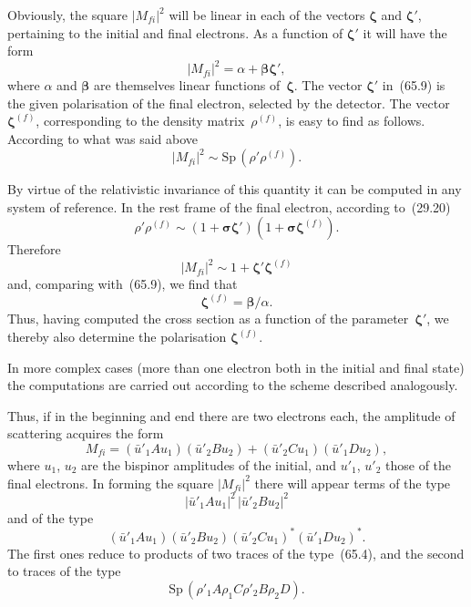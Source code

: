 Obviously, the square $|M_{fi}|^2$ will be linear in each of the vectors $\boldsymbol{\zeta}$ and $\boldsymbol{\zeta}'$, pertaining to the initial and final electrons. As a function of $\boldsymbol{\zeta}'$ it will have the form
\begin{equation}
|M_{fi}|^2 = \alpha + \boldsymbol{\beta}\boldsymbol{\zeta}',
\tag{65.9}
\end{equation}
where $\alpha$ and $\boldsymbol{\beta}$ are themselves linear functions of~$\boldsymbol{\zeta}$. The vector $\boldsymbol{\zeta}'$ in~(65.9) is the given polarisation of the final electron, selected by the detector. The vector $\boldsymbol{\zeta}^{(f)}$, corresponding to the density matrix~$\rho^{(f)}$, is easy to find as follows. According to what was said above
\[
|M_{fi}|^2 \sim \mathrm{Sp}\,(\rho'\rho^{(f)}).
\]

By virtue of the relativistic invariance of this quantity it can be computed in any system of reference. In the rest frame of the final electron, according to~(29.20)
\[
\rho'\rho^{(f)} \sim (1 + \boldsymbol{\sigma}\boldsymbol{\zeta}')(1 + \boldsymbol{\sigma}\boldsymbol{\zeta}^{(f)}).
\]
Therefore
\[
|M_{fi}|^2 \sim 1 + \boldsymbol{\zeta}'\boldsymbol{\zeta}^{(f)}
\]
and, comparing with~(65.9), we find that
\begin{equation}
\boldsymbol{\zeta}^{(f)} = \boldsymbol{\beta}/\alpha.
\tag{65.10}
\end{equation}
Thus, having computed the cross section as a function of the parameter~$\boldsymbol{\zeta}'$, we thereby also determine the polarisation $\boldsymbol{\zeta}^{(f)}$.

In more complex cases (more than one electron both in the initial and final state) the computations are carried out according to the scheme described analogously.

Thus, if in the beginning and end there are two electrons each, the amplitude of scattering acquires the form
\[
M_{fi} = (\bar{u}'_1 Au_1)(\bar{u}'_2 Bu_2) + (\bar{u}'_2 Cu_1)(\bar{u}'_1 Du_2),
\]
where $u_1$, $u_2$ are the bispinor amplitudes of the initial, and $u'_1$, $u'_2$ those of the final electrons. In forming the square $|M_{fi}|^2$ there will appear terms of the type
\[
|\bar{u}'_1 Au_1|^2\,|\bar{u}'_2 Bu_2|^2
\]
and of the type
\[
(\bar{u}'_1 Au_1)(\bar{u}'_2 Bu_2)(\bar{u}'_2 Cu_1)^*(\bar{u}'_1 Du_2)^*.
\]
The first ones reduce to products of two traces of the type~(65.4), and the second to traces of the type
\[
\mathrm{Sp}\,(\rho'_1 A\rho_1 C\rho'_2 B\rho_2 D).
\]


